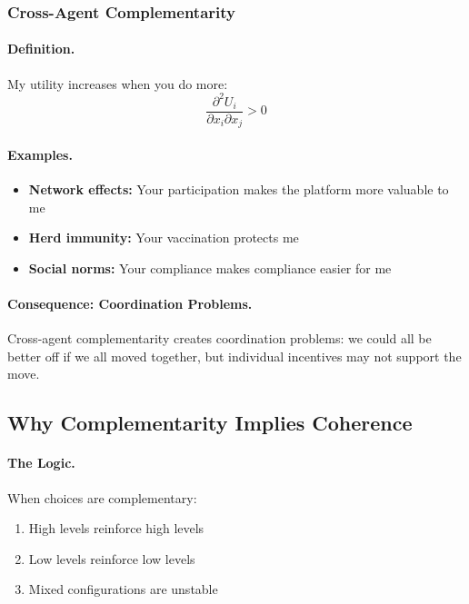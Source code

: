 \documentclass[12pt,a4paper]{article}
\begin{document}
\subsubsection{Cross-Agent Complementarity}

\paragraph{Definition.}
My utility increases when you do more:
\begin{equation}
  \frac{\partial^2 U_i}{\partial x_i \partial x_j} > 0
\end{equation}

\paragraph{Examples.}
\begin{itemize}
  \item \textbf{Network effects:} Your participation makes the platform more valuable to me
  \item \textbf{Herd immunity:} Your vaccination protects me
  \item \textbf{Social norms:} Your compliance makes compliance easier for me
\end{itemize}

\paragraph{Consequence: Coordination Problems.}
Cross-agent complementarity creates coordination problems:
we could all be better off if we all moved together,
but individual incentives may not support the move.

\subsection{Why Complementarity Implies Coherence}

\paragraph{The Logic.}
When choices are complementary:
\begin{enumerate}
  \item High levels reinforce high levels
  \item Low levels reinforce low levels
  \item Mixed configurations are unstable
\end{enumerate}
\end{document}

